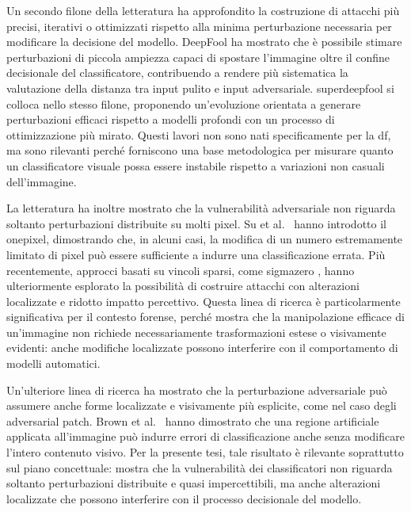 Un secondo filone della letteratura ha approfondito la costruzione di attacchi
più precisi, iterativi o ottimizzati rispetto alla minima perturbazione
necessaria per modificare la decisione del modello. DeepFool
\cite{moosavi2016deepfool} ha mostrato che è possibile stimare perturbazioni di
piccola ampiezza capaci di spostare l'immagine oltre il confine decisionale del
classificatore, contribuendo a rendere più sistematica la valutazione della
distanza tra input pulito e input adversariale. \gls{superdeepfool}
\cite{zhang2024superdeepfool} si colloca nello stesso filone, proponendo
un'evoluzione orientata a generare perturbazioni efficaci rispetto a modelli
profondi con un processo di ottimizzazione più mirato. Questi lavori non sono
nati specificamente per la \gls{df}, ma sono rilevanti perché forniscono una
base metodologica per misurare quanto un classificatore visuale possa essere
instabile rispetto a variazioni non casuali dell'immagine.

La letteratura ha inoltre mostrato che la vulnerabilità adversariale non
riguarda soltanto perturbazioni distribuite su molti pixel. Su et
al.~\cite{su2019onepixel} hanno introdotto il \gls{onepixel}, dimostrando che,
in alcuni casi, la modifica di un numero estremamente limitato di pixel può
essere sufficiente a indurre una classificazione errata. Più recentemente,
approcci basati su vincoli sparsi, come \gls{sigmazero}
\cite{zhao2024sigmazero}, hanno ulteriormente esplorato la possibilità di
costruire attacchi con alterazioni localizzate e ridotto impatto percettivo.
Questa linea di ricerca è particolarmente significativa per il contesto forense,
perché mostra che la manipolazione efficace di un'immagine non richiede
necessariamente trasformazioni estese o visivamente evidenti: anche modifiche
localizzate possono interferire con il comportamento di modelli automatici.

Un'ulteriore linea di ricerca ha mostrato che la perturbazione adversariale può
assumere anche forme localizzate e visivamente più esplicite, come nel caso
degli adversarial patch. Brown et al.~\cite{brown2017patch} hanno dimostrato
che una regione artificiale applicata all'immagine può indurre errori di
classificazione anche senza modificare l'intero contenuto visivo. Per la
presente tesi, tale risultato è rilevante soprattutto sul piano concettuale:
mostra che la vulnerabilità dei classificatori non riguarda soltanto
perturbazioni distribuite e quasi impercettibili, ma anche alterazioni
localizzate che possono interferire con il processo decisionale del modello.

